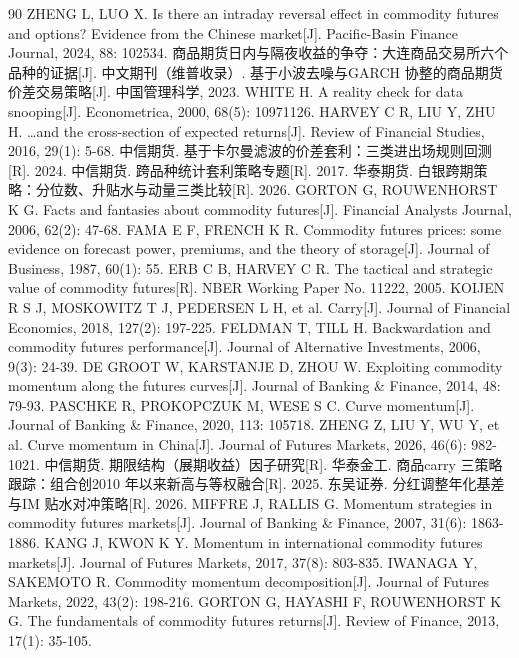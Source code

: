 \documentclass[12pt,a4paper]{ctexart}
\begin{document}
\begin{thebibliography}{90}
 ZHENG L, LUO X. Is there an intraday reversal effect in commodity futures and options? Evidence from the Chinese market[J]. Pacific-Basin Finance Journal, 2024, 88: 102534.
 商品期货日内与隔夜收益的争夺：大连商品交易所六个品种的证据[J]. 中文期刊（维普收录）.
 基于小波去噪与GARCH 协整的商品期货价差交易策略[J]. 中国管理科学, 2023.
 WHITE H. A reality check for data snooping[J]. Econometrica, 2000, 68(5): 10971126.
 HARVEY C R, LIU Y, ZHU H. …and the cross-section of expected returns[J]. Review of Financial Studies, 2016, 29(1): 5-68.
 中信期货. 基于卡尔曼滤波的价差套利：三类进出场规则回测[R]. 2024.
 中信期货. 跨品种统计套利策略专题[R]. 2017.
 华泰期货. 白银跨期策略：分位数、升贴水与动量三类比较[R]. 2026.
 GORTON G, ROUWENHORST K G. Facts and fantasies about commodity futures[J]. Financial Analysts Journal, 2006, 62(2): 47-68.
 FAMA E F, FRENCH K R. Commodity futures prices: some evidence on forecast power, premiums, and the theory of storage[J]. Journal of Business, 1987, 60(1): 55.
 ERB C B, HARVEY C R. The tactical and strategic value of commodity futures[R]. NBER Working Paper No. 11222, 2005.
 KOIJEN R S J, MOSKOWITZ T J, PEDERSEN L H, et al. Carry[J]. Journal of Financial Economics, 2018, 127(2): 197-225.
 FELDMAN T, TILL H. Backwardation and commodity futures performance[J]. Journal of Alternative Investments, 2006, 9(3): 24-39.
 DE GROOT W, KARSTANJE D, ZHOU W. Exploiting commodity momentum along the futures curves[J]. Journal of Banking \& Finance, 2014, 48: 79-93.
 PASCHKE R, PROKOPCZUK M, WESE S C. Curve momentum[J]. Journal of Banking \& Finance, 2020, 113: 105718.
 ZHENG Z, LIU Y, WU Y, et al. Curve momentum in China[J]. Journal of Futures Markets, 2026, 46(6): 982-1021.
 中信期货. 期限结构（展期收益）因子研究[R].
 华泰金工. 商品carry 三策略跟踪：组合创2010 年以来新高与等权融合[R]. 2025.
 东吴证券. 分红调整年化基差与IM 贴水对冲策略[R]. 2026.
 MIFFRE J, RALLIS G. Momentum strategies in commodity futures markets[J]. Journal of Banking \& Finance, 2007, 31(6): 1863-1886.
 KANG J, KWON K Y. Momentum in international commodity futures markets[J]. Journal of Futures Markets, 2017, 37(8): 803-835.
 IWANAGA Y, SAKEMOTO R. Commodity momentum decomposition[J]. Journal of Futures Markets, 2022, 43(2): 198-216.
 GORTON G, HAYASHI F, ROUWENHORST K G. The fundamentals of commodity futures returns[J]. Review of Finance, 2013, 17(1): 35-105.

\end{thebibliography}
\end{document}
